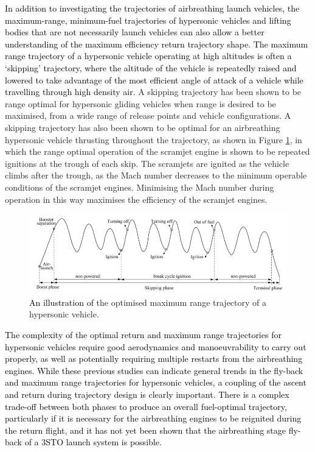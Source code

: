 \textcolor{black}{
	In addition to investigating the trajectories of airbreathing launch vehicles, the maximum-range, minimum-fuel trajectories of hypersonic vehicles and lifting bodies that are not necessarily launch vehicles can also allow a better understanding of the maximum efficiency return trajectory shape. The maximum range trajectory of a hypersonic vehicle operating at high altitudes is often a `skipping' trajectory, where the altitude of the vehicle is repeatedly raised and lowered to take advantage of the most efficient angle of attack of a vehicle while travelling through high density air\cite{Moshman2014,Darby2011,Toso2015,Chai2015,Pesch1980}.} A skipping trajectory has been shown to be range optimal for hypersonic gliding vehicles when range is desired to be maximised, from a wide range of release points and vehicle configurations\cite{Eggers1957,Moshman2014,Pesch1980,Moshman2014,Darby2011,Toso2015,Tetlow1992,Darby2011}. A skipping trajectory has also been shown to be optimal for an airbreathing hypersonic vehicle thrusting throughout the trajectory\cite{Kanda2007,Chai2015}, as shown in Figure \ref{fig:chai-boostskip}, in which the range optimal operation of the scramjet engine is shown to be repeated ignitions at the trough of each skip\cite{Chai2015}. The scramjets are ignited as the vehicle climbs after the trough, as the Mach number decreases to the minimum operable conditions of the scramjet engines\cite{Chai2015}. Minimising the Mach number during operation in this way maximises the efficiency of the scramjet engines\cite{Chai2015}.
\begin{figure}[ht]
	\centering
	\includegraphics[width=0.9\linewidth]{"figures/2_literature-review/chai-boost skip"}
	\caption{\textcolor{black}{An illustration of }the optimised maximum range trajectory of a hypersonic vehicle\cite{Chai2015}.}
	\label{fig:chai-boostskip}
\end{figure}

\textcolor{black}{
The complexity of the optimal return and maximum range trajectories for hypersonic vehicles require good aerodynamics and manoeuvrability to carry out properly, as well as potentially requiring multiple restarts from the airbreathing engines. While these previous studies can indicate general trends in the fly-back and maximum range trajectories for hypersonic vehicles, a coupling of the ascent and return during trajectory design is clearly important. There is a complex trade-off between both phases to produce an overall fuel-optimal trajectory, particularly if it is necessary for the airbreathing engines to be reignited during the return flight, and it has not yet been shown that the airbreathing stage fly-back of a 3STO launch system is possible. 
}




